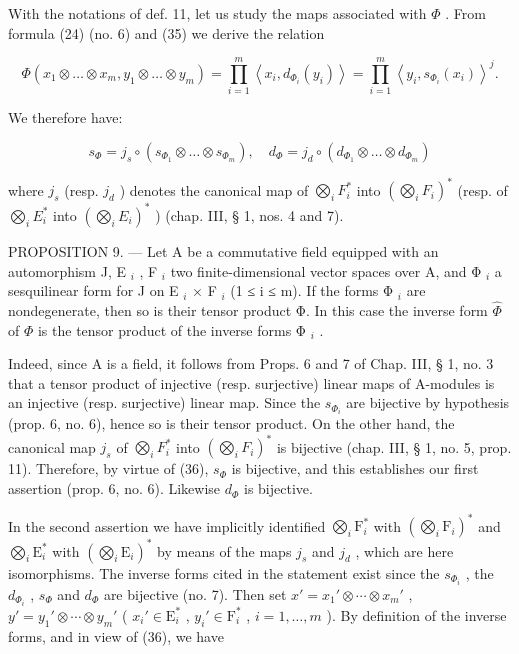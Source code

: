 With the notations of def. 11, let us study the maps associated with \(\Phi\) . From formula (24) (no. 6) and (35) we derive the relation

\[
\Phi (x _ {1} \otimes \dots \otimes x _ {m}, y _ {1} \otimes \dots \otimes y _ {m}) = \prod_ {i = 1} ^ {m} \left\langle x _ {i}, d _ {\Phi_ {i}} (y _ {i}) \right\rangle = \prod_ {i = 1} ^ {m} \left\langle y _ {i}, s _ {\Phi_ {i}} (x _ {i}) \right\rangle^ {j}.
\]

We therefore have:

\[
s _ {\Phi} = j _ {s} \circ (s _ {\Phi_ {1}} \otimes \dots \otimes s _ {\Phi_ {m}}), \quad d _ {\Phi} = j _ {d} \circ (d _ {\Phi_ {1}} \otimes \dots \otimes d _ {\Phi_ {m}})\tag{36}
\]

where \(j_s\) (resp. \(j_d\) ) denotes the canonical map of \(\bigotimes_i F_i^*\) into \((\bigotimes_i F_i)^*\) (resp. of \(\bigotimes_i E_i^*\) into \((\bigotimes_i E_i)^*\) ) (chap. III, § 1, nos. 4 and 7).

PROPOSITION 9. — Let A be a commutative field equipped with an automorphism J, E \(_{i}\) , F \(_{i}\) two finite-dimensional vector spaces over A, and Φ \(_{i}\) a sesquilinear form for J on E \(_{i}\) × F \(_{i}\) (1 ≤ i ≤ m). If the forms Φ \(_{i}\) are nondegenerate, then so is their tensor product Φ. In this case the inverse form \(\hat{\Phi}\) of \(\Phi\) is the tensor product of the inverse forms Φ \(_{i}\) .

Indeed, since A is a field, it follows from Props. 6 and 7 of Chap. III, § 1, no. 3 that a tensor product of injective (resp. surjective) linear maps of A-modules is an injective (resp. surjective) linear map. Since the \(s_{\Phi_i}\) are bijective by hypothesis (prop. 6, no. 6), hence so is their tensor product. On the other hand, the canonical map \(j_s\) of \(\bigotimes_i F_i^*\) into \((\bigotimes_i F_i)^*\) is bijective (chap. III, § 1, no. 5, prop. 11). Therefore, by virtue of (36), \(s_\Phi\) is bijective, and this establishes our first assertion (prop. 6, no. 6). Likewise \(d_\Phi\) is bijective.

In the second assertion we have implicitly identified \(\bigotimes_{i} \mathrm{F}_{i}^{*}\) with \((\bigotimes_{i} \mathrm{F}_{i})^{*}\) and \(\bigotimes_{i} \mathrm{E}_{i}^{*}\) with \((\bigotimes_{i} \mathrm{E}_{i})^{*}\) by means of the maps \(j_{s}\) and \(j_{d}\) , which are here isomorphisms. The inverse forms cited in the statement exist since the \(s_{\Phi_{i}}\) , the \(d_{\Phi_{i}}\) , \(s_{\Phi}\) and \(d_{\Phi}\) are bijective (no. 7). Then set \(x' = x_{1}' \otimes \cdots \otimes x_{m}'\) , \(y' = y_{1}' \otimes \cdots \otimes y_{m}'\) ( \(x_{i}' \in \mathrm{E}_{i}^{*}\) , \(y_{i}' \in \mathrm{F}_{i}^{*}\) , \(i = 1, \ldots, m\) ). By definition of the inverse forms, and in view of (36), we have

